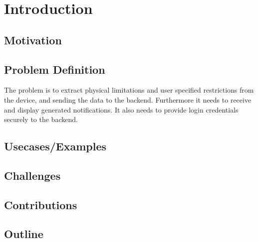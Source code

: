 
\chapter{Introduction} %
\label{Chapter1}


\section{Motivation}

\section{Problem Definition}
The problem is to extract physical limitations  and user specified restrictions from the device, and sending the data to the backend. Furthermore it needs to receive and display generated notifications. It also needs to provide login credentials securely to the backend.



\section{Usecases/Examples}

\section{Challenges}

\section{Contributions}

\section{Outline}

